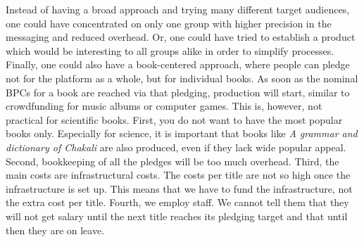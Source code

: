 \documentclass[nonflat,smallfont
]{langsci/langscibook}
\newcommand{\othersolutions}[1]{
  \renewcommand{\tblslinecolour}{lsDarkGreenOne}
  \tblssy{more}{Other solutions}{\vspace*{-5mm}#1}
}
\renewcommand{\tblssy}[4][black!12]{%
  \renewcommand{\langscisymbol}{#2}\renewcommand{\tblsboxcolor}{#1}
  \begin{mdframed}[style=yellowexercise,frametitle={#3}]
    #4
  \end{mdframed}
}
\begin{document}
\othersolutions{Instead of having a broad approach and trying many different target audiences, one could have concentrated on only one group with higher precision in the messaging and reduced overhead. Or, one could have tried to establish a product which would be interesting to all groups alike in order to simplify processes. Finally, one could also have a book-centered approach, where people can pledge not for the platform as a whole, but for individual books. As soon as the nominal BPCs for a book are reached via that pledging, production will start, similar to crowdfunding for music albums or computer games. This is, however, not practical for scientific books. First, you do not want to have the most popular books only. Especially for science, it is important that books like \textit{A grammar and dictionary of Chakali} are also produced, even if they lack wide popular appeal. Second, bookkeeping of all the pledges will be too much overhead. Third, the main costs are infrastructural costs. The costs per title are not so high once the infrastructure is set up. This means that we have to fund the infrastructure, not the extra cost per title. Fourth, we employ staff. We cannot tell them that they will not get salary until the next title reaches its pledging target and that until then they are on leave.}

 
\end{document}
